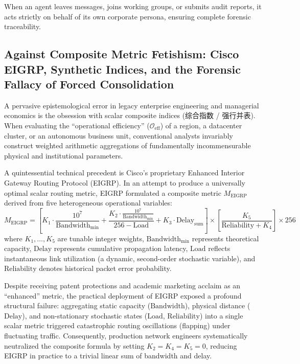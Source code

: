 \documentclass[11pt,a4paper]{article}
\begin{document}
When an agent leaves messages, joins working groups, or submits audit reports, it acts strictly on behalf of its own corporate persona, ensuring complete forensic traceability.

\subsection{Against Composite Metric Fetishism: Cisco EIGRP, Synthetic Indices, and the Forensic Fallacy of Forced Consolidation}

A pervasive epistemological error in legacy enterprise engineering and managerial economics is the obsession with scalar composite indices (综合指数 / 强行并表). When evaluating the ``operational efficiency'' ($\mathcal{O}_{\text{eff}}$) of a region, a datacenter cluster, or an autonomous business unit, conventional analysts invariably construct weighted arithmetic aggregations of fundamentally incommensurable physical and institutional parameters.

A quintessential technical precedent is Cisco's proprietary Enhanced Interior Gateway Routing Protocol (EIGRP). In an attempt to produce a universally optimal scalar routing metric, EIGRP formulated a composite metric $M_{\text{EIGRP}}$ derived from five heterogeneous operational variables:
\begin{equation}
M_{\text{EIGRP}} = \left[ K_1 \cdot \frac{10^7}{\text{Bandwidth}_{\min}} + \frac{K_2 \cdot \frac{10^7}{\text{Bandwidth}_{\min}}}{256 - \text{Load}} + K_3 \cdot \text{Delay}_{\text{sum}} \right] \times \left[ \frac{K_5}{\text{Reliability} + K_4} \right] \times 256
\end{equation}
where $K_1, \dots, K_5$ are tunable integer weights, $\text{Bandwidth}_{\min}$ represents theoretical capacity, $\text{Delay}$ represents cumulative propagation latency, $\text{Load}$ reflects instantaneous link utilization (a dynamic, second-order stochastic variable), and $\text{Reliability}$ denotes historical packet error probability.

Despite receiving patent protections and academic marketing acclaim as an ``enhanced'' metric, the practical deployment of EIGRP exposed a profound structural failure: aggregating static capacity ($\text{Bandwidth}$), physical distance ($\text{Delay}$), and non-stationary stochastic states ($\text{Load}$, $\text{Reliability}$) into a single scalar metric triggered catastrophic routing oscillations (flapping) under fluctuating traffic. Consequently, production network engineers systematically neutralized the composite formula by setting $K_2 = K_4 = K_5 = 0$, reducing EIGRP in practice to a trivial linear sum of bandwidth and delay.
\end{document}
